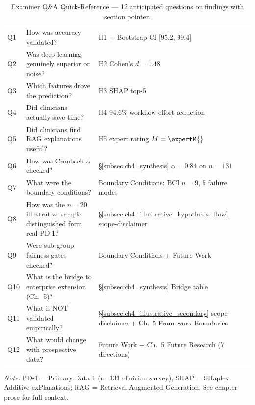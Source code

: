 {\tablestripes\tablefontsize
{}
\begin{xltabular}{\textwidth}{@{} >{\centering\arraybackslash}p{1.2cm} L >{\raggedright\arraybackslash}p{3.2cm} @{}}
\caption[Examiner Q\&A Quick-Reference --- Chapter~4]{Examiner Q\&A Quick-Reference --- 12 anticipated questions on findings with section pointer.}\label{tab:ch4_examiner_qa_snapshot} \\
\toprule
{} &  &  \\
\midrule
\endfirsthead
\endhead
\bottomrule
\endlastfoot
Q1 & How was \asdacc{} accuracy validated? & H1 + Bootstrap CI [95.2, 99.4] \\
Q2 & Was deep learning genuinely superior or noise? & H2 Cohen's $d=1.48$ \\
Q3 & Which features drove the prediction? & H3 SHAP top-5 \\
Q4 & Did clinicians actually save time? & H4 94.6\% workflow effort reduction \\
Q5 & Did clinicians find RAG explanations useful? & H5 expert rating $M = \expertM{}$ \\
Q6 & How was Cronbach $\alpha$ checked? & §\ref{subsec:ch4_synthesis} $\alpha=0.84$ on $n{=}131$ \\
Q7 & What were the boundary conditions? & Boundary Conditions: BCI $n=9$, 5 failure modes \\
Q8 & How was the $n{=}20$ illustrative sample distinguished from real PD-1? & §\ref{subsec:ch4_illustrative_hypothesis_flow} scope-disclaimer \\
Q9 & Were sub-group fairness gates checked? & Boundary Conditions + Future Work \\
Q10 & What is the bridge to enterprise extension (Ch.~5)? & §\ref{subsec:ch4_synthesis} Bridge table \\
Q11 & What is NOT validated empirically? & §\ref{subsec:ch4_illustrative_secondary} scope-disclaimer + Ch.~5 Framework Boundaries \\
Q12 & What would change with prospective data? & Future Work + Ch.~5 Future Research (7 directions) \\
\end{xltabular}}
\vspace{0.3em}\noindent\textit{Note.} PD-1 = Primary Data 1 (n=131 clinician survey); SHAP = SHapley Additive exPlanations; RAG = Retrieval-Augmented Generation. See chapter prose for full context.

